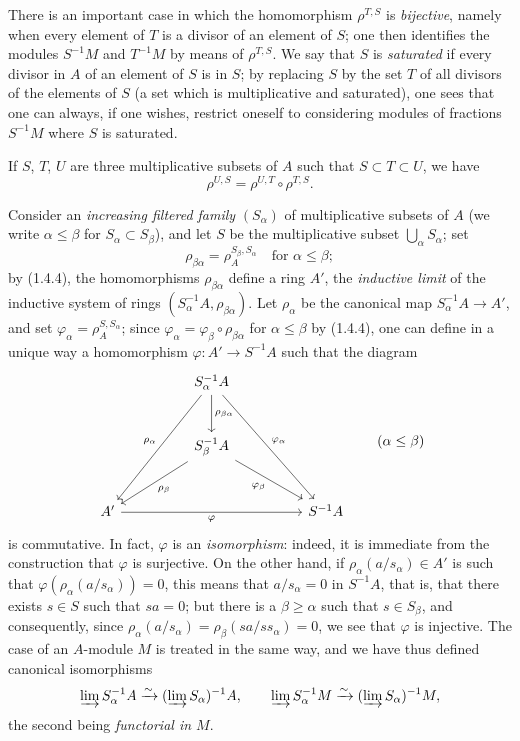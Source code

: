 \begin{env}[1.4.3]
\label{0.1.4.3}
There is an important case in which the homomorphism $\rho^{T,S}$ is \emph{bijective}, namely when every element of $T$ is a divisor of an element of $S$; one then identifies the modules $S^{-1}M$ and $T^{-1}M$ by means of $\rho^{T,S}$.
We say that $S$ is \emph{saturated} if every divisor in $A$ of an element of $S$ is in $S$; by replacing $S$ by the set $T$ of all divisors of the elements of $S$ (a set which is multiplicative and saturated), one sees that one can always, if one wishes, restrict oneself to considering modules of fractions $S^{-1}M$ where $S$ is saturated.
\end{env}

\begin{env}[1.4.4]
\label{0.1.4.4}
If $S$, $T$, $U$ are three multiplicative subsets of $A$ such that $S\subset T\subset U$, we have
\[
  \rho^{U,S}=\rho^{U,T}\circ\rho^{T,S}.
\]
\end{env}

\begin{env}[1.4.5]
\label{0.1.4.5}
Consider an \emph{increasing filtered family} $(S_\alpha)$ of multiplicative subsets of $A$ (we write $\alpha\leq\beta$ for $S_\alpha\subset S_\beta$), and let $S$ be the multiplicative subset $\bigcup_\alpha S_\alpha$; set
\[
  \rho_{\beta\alpha}=\rho_A^{S_\beta,S_\alpha}\quad\text{for }\alpha\leq\beta;
\]
by (1.4.4), the homomorphisms $\rho_{\beta\alpha}$ define a ring $A'$, the \emph{inductive limit} of the inductive system of rings $(S_\alpha^{-1}A,\rho_{\beta\alpha})$.
Let $\rho_\alpha$ be the canonical map $S_\alpha^{-1}A\to A'$, and set $\varphi_\alpha=\rho_A^{S,S_\alpha}$; since $\varphi_\alpha=\varphi_\beta\circ\rho_{\beta\alpha}$ for $\alpha\leq\beta$ by (1.4.4), one can define in a unique way a homomorphism $\varphi:A'\to S^{-1}A$ such that the diagram
\[
\begin{tikzcd}[column sep=huge,row sep=large]
  & S_\alpha^{-1}A
      \arrow[ddl,"\rho_\alpha"']
      \arrow[d,"\rho_{\beta\alpha}"]
      \arrow[ddr,"\varphi_\alpha"] & \\
  & S_\beta^{-1}A
      \arrow[dl,"\rho_\beta"]
      \arrow[dr,"\varphi_\beta"'] & \\
A' \arrow[rr,"\varphi"'] & & S^{-1}A
\end{tikzcd}
\qquad(\alpha\leq\beta)
\]
is commutative.
In fact, $\varphi$ is an \emph{isomorphism}: indeed, it is immediate from the construction that $\varphi$ is surjective.
On the other hand, if $\rho_\alpha(a/s_\alpha)\in A'$ is such that $\varphi(\rho_\alpha(a/s_\alpha))=0$, this means that $a/s_\alpha=0$ in $S^{-1}A$, that is, that there exists $s\in S$ such that $sa=0$; but there is a $\beta\geq\alpha$ such that $s\in S_\beta$, and consequently, since $\rho_\alpha(a/s_\alpha)=\rho_\beta(sa/ss_\alpha)=0$, we see that $\varphi$ is injective.
The case of an $A$-module $M$ is treated in the same way, and we have thus defined canonical isomorphisms
\[
  \varinjlim S_\alpha^{-1}A\xrightarrow{\sim}
  (\varinjlim S_\alpha)^{-1}A,
  \qquad
  \varinjlim S_\alpha^{-1}M\xrightarrow{\sim}
  (\varinjlim S_\alpha)^{-1}M,
\]
the second being \emph{functorial in $M$}.
\end{env}

